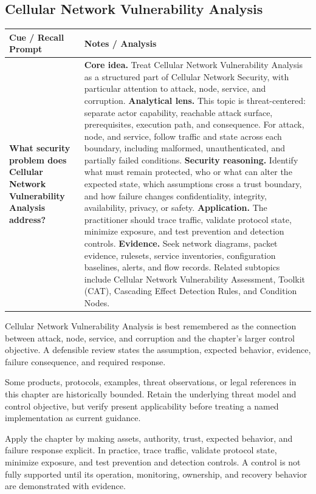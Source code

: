 \documentclass[11pt]{article}
\newcommand{\CornellHeader}{%
\rowcolor{Navy}\color{white}\bfseries Cue / Recall Prompt & \color{white}\bfseries Notes / Analysis\\\hline}
\newcommand{\CornellRow}[2]{%
\cellcolor{CueGray}\RaggedRight\textbf{#1} & \RaggedRight #2\\\hline}
\begin{document}
\subsection*{Cellular Network Vulnerability Analysis}
\begin{longtable}{>{\RaggedRight\arraybackslash}p{}|>{\RaggedRight\arraybackslash}p{}}
\CornellHeader
\CornellRow{What security problem does Cellular Network Vulnerability Analysis address?}{\textbf{Core idea.} Treat Cellular Network Vulnerability Analysis as a structured part of Cellular Network Security, with particular attention to attack, node, service, and corruption. \textbf{Analytical lens.} This topic is threat-centered: separate actor capability, reachable attack surface, prerequisites, execution path, and consequence. For attack, node, and service, follow traffic and state across each boundary, including malformed, unauthenticated, and partially failed conditions. \textbf{Security reasoning.} Identify what must remain protected, who or what can alter the expected state, which assumptions cross a trust boundary, and how failure changes confidentiality, integrity, availability, privacy, or safety. \textbf{Application.} The practitioner should trace traffic, validate protocol state, minimize exposure, and test prevention and detection controls. \textbf{Evidence.} Seek network diagrams, packet evidence, rulesets, service inventories, configuration baselines, alerts, and flow records. Related subtopics include Cellular Network Vulnerability Assessment, Toolkit (CAT), Cascading Effect Detection Rules, and Condition Nodes.}
\end{longtable}
\begin{topicsummary}
Cellular Network Vulnerability Analysis is best remembered as the connection between attack, node, service, and corruption and the chapter's larger control objective. A defensible review states the assumption, expected behavior, evidence, failure consequence, and required response.
\end{topicsummary}
\begin{historybox}
Some products, protocols, examples, threat observations, or legal references in this chapter are historically bounded. Retain the underlying threat model and control objective, but verify present applicability before treating a named implementation as current guidance.
\end{historybox}
\begin{defensebox}
Apply the chapter by making assets, authority, trust, expected behavior, and failure response explicit. In practice, trace traffic, validate protocol state, minimize exposure, and test prevention and detection controls. A control is not fully supported until its operation, monitoring, ownership, and recovery behavior are demonstrated with evidence.
\end{defensebox}
\end{document}
